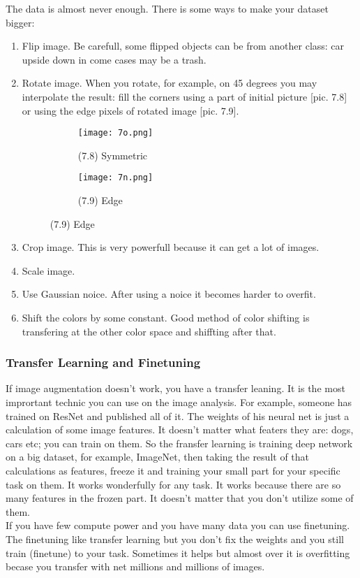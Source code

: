 The data is almost never enough. There is some ways to make your dataset bigger:\\
\begin{enumerate}[label=$\bullet$]
  \item Flip image. Be carefull, some flipped objects can be from another class: car upside down in come cases may be a trash.
  \item Rotate image. When you rotate, for example, on 45 degrees you may interpolate the result: fill the corners using a part of initial picture [pic. 7.8] or using the edge pixels of rotated image [pic. 7.9].\\
  \begin{figure}[h]
  \centering
  \begin{subfigure}[l]{0.2\linewidth}
    \texttt{[image: 7o.png]}
    \caption*{(7.8) Symmetric}
  \end{subfigure}
  \hspace{2cm}
  \begin{subfigure}[r]{0.2\linewidth}
    \texttt{[image: 7n.png]}
    \caption*{(7.9) Edge}
  \end{subfigure}
\end{figure}
  \item Crop image. This is very powerfull because it can get a lot of images.
  \item Scale image.
  \item Use Gaussian noice. After using a noice it becomes harder to overfit.
  \item Shift the colors by some constant. Good method of color shifting is transfering at the other color space and shiffting after that.
\end{enumerate}

\subsubsection*{Transfer Learning and Finetuning}

If image augmentation doesn't work, you have a transfer leaning. It is the most imprortant technic you can use on the image analysis. For example, someone has trained on ResNet and published all of it. The weights of his neural net is just a calculation of some image features. It doesn't matter what featers they are: dogs, cars etc; you can train on them. So the fransfer learning is training deep network on a big dataset, for example, ImageNet, then taking the result of that calculations as features, freeze it and training your small part for your specific task on them. It works wonderfully for any task. It works because there are so many features in the frozen part. It doesn't matter that you don't utilize some of them.\\
If you have few compute power and you have many data you can use finetuning. The finetuning like transfer learning but you don't fix the weights and you still train (finetune) to your task. Sometimes it helps but almost over it is overfitting becase you transfer with net millions and millions of images.